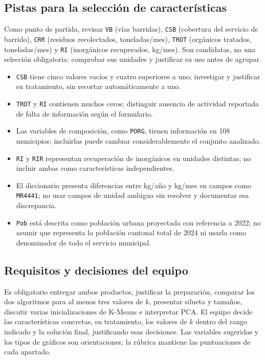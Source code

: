 \documentclass[a4,11pt]{aleph-notas}
\begin{document}
\subsection*{Pistas para la selección de características}
Como punto de partida, revisar \texttt{VB} (vías barridas), \texttt{CSB} (cobertura del servicio de barrido), \texttt{CRR} (residuos recolectados, toneladas/mes), \texttt{TROT} (orgánicos tratados, toneladas/mes) y \texttt{RI} (inorgánicos recuperados, kg/mes). Son candidatas, no una selección obligatoria: comprobar sus unidades y justificar su uso antes de agrupar.
\begin{itemize}[leftmargin=*]
    \item \texttt{CSB} tiene cinco valores vacíos y cuatro superiores a uno; investigar y justificar su tratamiento, sin recortar automáticamente a uno.
    \item \texttt{TROT} y \texttt{RI} contienen muchos ceros; distinguir ausencia de actividad reportada de falta de información según el formulario.
    \item Las variables de composición, como \texttt{PORG}, tienen información en 108 municipios; incluirlas puede cambiar considerablemente el conjunto analizado.
    \item \texttt{RI} y \texttt{RIR} representan recuperación de inorgánicos en unidades distintas; no incluir ambas como características independientes.
    \item El diccionario presenta diferencias entre kg/año y kg/mes en campos como \texttt{MR4441}; no usar campos de unidad ambigua sin resolver y documentar esa discrepancia.
    \item \texttt{Pob} está descrita como población urbana proyectada con referencia a 2022; no asumir que representa la población cantonal total de 2024 ni usarla como denominador de todo el servicio municipal.
\end{itemize}

\subsection*{Requisitos y decisiones del equipo}
Es obligatorio entregar ambos productos, justificar la preparación, comparar los dos algoritmos para al menos tres valores de $k$, presentar silueta y tamaños, discutir varias inicializaciones de K-Means e interpretar PCA. El equipo decide las características concretas, su tratamiento, los valores de $k$ dentro del rango indicado y la solución final, justificando esas decisiones. Las variables sugeridas y los tipos de gráficos son orientaciones; la rúbrica mantiene las puntuaciones de cada apartado.
\end{document}
